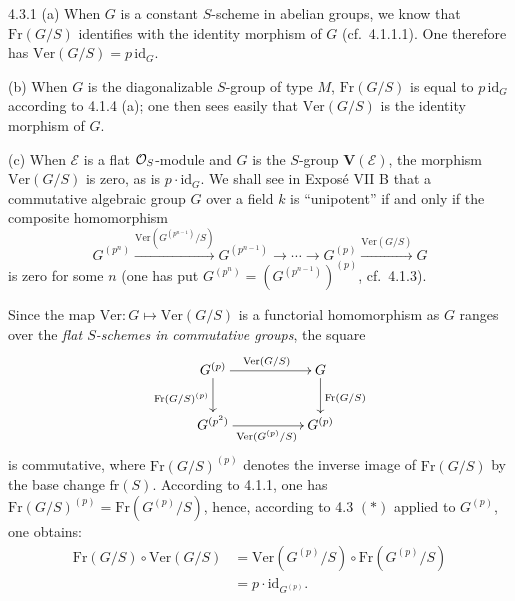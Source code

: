 \begin{examples}{4.3.1}\label{VIIA.4.3.1}
(a) When $G$ is a constant $S$-scheme in abelian groups, we know that $\mathrm{Fr}(G/S)$ identifies with the identity morphism of $G$ (cf.\ 4.1.1.1). One therefore has $\mathrm{Ver}(G/S)=p\,\mathrm{id}_G$.

(b) When $G$ is the diagonalizable $S$-group of type $M$, $\mathrm{Fr}(G/S)$ is equal to $p\,\mathrm{id}_G$ according to 4.1.4 (a); one then sees easily that $\mathrm{Ver}(G/S)$ is the identity morphism of $G$.

(c) When $\mathscr E$ is a flat $\mathcal{O}_S$-module and $G$ is the $S$-group $\mathbf V(\mathscr E)$, the morphism $\mathrm{Ver}(G/S)$ is zero, as is $p\cdot\mathrm{id}_G$. We shall see in Expos\'e VII B that a commutative algebraic group $G$ over a field $k$ is ``unipotent'' if and only if the composite homomorphism
\[
G^{(p^n)}\xrightarrow{\mathrm{Ver}(G^{(p^{n-1})}/S)}G^{(p^{n-1})}\longrightarrow\cdots\longrightarrow G^{(p)}\xrightarrow{\mathrm{Ver}(G/S)}G
\]
is zero for some $n$ (one has put $G^{(p^n)}=(G^{(p^{n-1})})^{(p)}$, cf.\ 4.1.3).
\end{examples}

Since the map $\mathrm{Ver}:G\mapsto\mathrm{Ver}(G/S)$ is a functorial homomorphism as $G$ ranges over the \emph{flat $S$-schemes in commutative groups}, the square
\[
\xymatrix@C=5em{G^{(p)}\ar[r]^{\mathrm{Ver}(G/S)}\ar[d]_{\mathrm{Fr}(G/S)^{(p)}}&G\ar[d]^{\mathrm{Fr}(G/S)}\\
G^{(p^2)}\ar[r]_{\mathrm{Ver}(G^{(p)}/S)}&G^{(p)}}
\]
is commutative, where $\mathrm{Fr}(G/S)^{(p)}$ denotes the inverse image of $\mathrm{Fr}(G/S)$ by the base change $\mathrm{fr}(S)$. According to 4.1.1, one has $\mathrm{Fr}(G/S)^{(p)}=\mathrm{Fr}(G^{(p)}/S)$, hence, according to 4.3 $(*)$ applied to $G^{(p)}$, one obtains:
\begin{equation}\tag{$**$}
\begin{aligned}
\mathrm{Fr}(G/S)\circ\mathrm{Ver}(G/S)&=\mathrm{Ver}(G^{(p)}/S)\circ\mathrm{Fr}(G^{(p)}/S)\\
&=p\cdot\mathrm{id}_{G^{(p)}}.
\end{aligned}
\end{equation}

